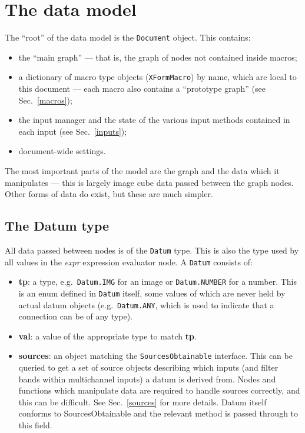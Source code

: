 
\clearpage
\section{The data model}
The ``root'' of the data model is the \texttt{Document} object.
This contains:
\begin{itemize}
\item the ``main graph'' --- that is, the graph of nodes not contained
inside macros;
\item a dictionary of macro type objects (\texttt{XFormMacro}) by name,
which are local to this document --- each macro also contains a ``prototype
graph'' (see Sec.~\ref{macros});
\item the input manager and the state of the various input methods
contained in each input (see Sec.~\ref{inputs});
\item document-wide settings.
\end{itemize}
The most important parts of the model are the graph
and the data which it manipulates --- this is largely
image cube data passed between the graph nodes.
Other forms of data do exist,
but these are much simpler.

\subsection{The Datum type}
All data passed between nodes is of the \texttt{Datum} type. This is also the type used by
all values in the \emph{expr} expression evaluator node. A \texttt{Datum} consists of:
\begin{itemize}
\item \textbf{tp}: a type, e.g.\ \texttt{Datum.IMG} for an image or \texttt{Datum.NUMBER} for a number. This is an enum
defined in \texttt{Datum} itself, some values of which are never held by actual datum objects (e.g.\ \texttt{Datum.ANY},
which is used to indicate that a connection can be of any type).
\item \textbf{val}: a value of the appropriate type to match \textbf{tp}.
\item \textbf{sources}: an object matching the \texttt{SourcesObtainable} interface. This can be queried to get a set
of source objects describing which inputs (and filter bands within multichannel inputs) a datum is derived from. Nodes
and functions which manipulate data are required to handle sources correctly, and this can be difficult. See Sec.~\ref{sources}
for more details. Datum itself conforms to SourcesObtainable and the relevant method is passed through to this field.
\end{itemize}


